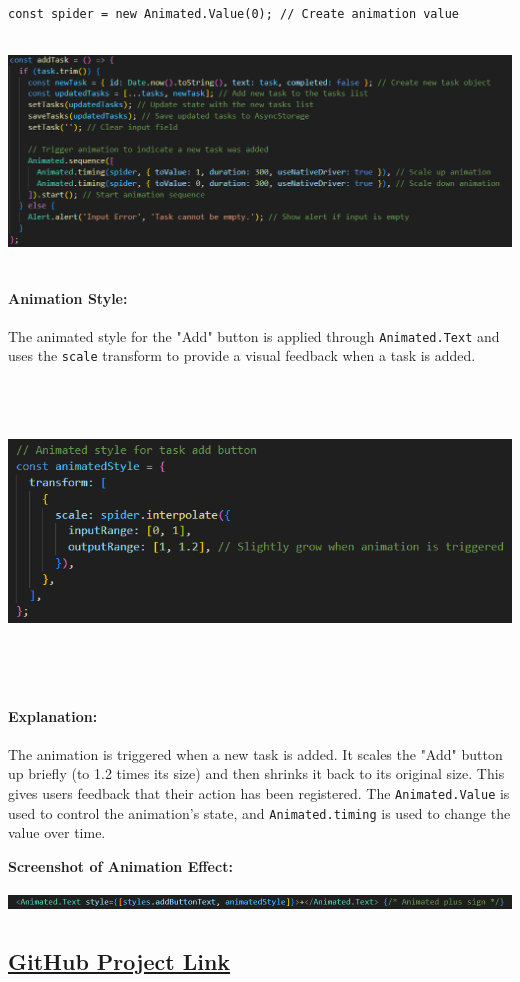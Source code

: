 \documentclass[12pt]{article}
\begin{document}
\begin{verbatim}
const spider = new Animated.Value(0); // Create animation value
\end{verbatim}
\begin{center}
    \includegraphics[width=\textwidth, height=6cm]{images/animation1.png} 
\end{center}

\paragraph{Animation Style:}
The animated style for the "Add" button is applied through \texttt{Animated.Text} and uses the \texttt{scale} transform to provide a visual feedback when a task is added.
\begin{center}
    \includegraphics[width=\textwidth, height=8cm]{images/animated2.png} 
\end{center}
\paragraph{Explanation:}
The animation is triggered when a new task is added. It scales the "Add" button up briefly (to 1.2 times its size) and then shrinks it back to its original size. This gives users feedback that their action has been registered. The \texttt{Animated.Value} is used to control the animation’s state, and \texttt{Animated.timing} is used to change the value over time.

\textbf{Screenshot of Animation Effect:}
\begin{center}
    \includegraphics[width=1\textwidth, height=0.6cm]{images/animated3.png} 
\end{center}

\begin{center}
    \section*{ \href{https://github.com/DeeapakSarun/ToDoApp.git}{GitHub Project Link}}
\end{center}
\end{document}
